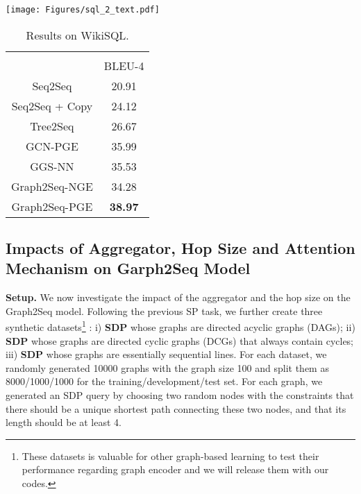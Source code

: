 \documentclass{article} \usepackage{iclr2019_conference,times}
\begin{document}
\begin{table}[t!]
\begin{minipage}[t]{0.53\linewidth}
    \vspace{0pt}
    \centering\texttt{[image: Figures/sql\_2\_text.pdf]}
    \label{fig:nlg_example}
  \end{minipage}
    \begin{minipage}[t]{0.4\linewidth}
     \vspace{0pt}
    \centering
    \small
    \begin{tabular}{cc}
    \\\\
     & BLEU-4  \\
\hline
    Seq2Seq & 20.91 \\
    Seq2Seq + Copy & 24.12 \\
    Tree2Seq & 26.67 \\
    \hline
    GCN-PGE & 35.99 \\
    GGS-NN & 35.53 \\
    Graph2Seq-NGE & 34.28 \\
    Graph2Seq-PGE & \textbf{38.97} \\
\hline
    \end{tabular}
    \caption{Results on WikiSQL.}
    \label{tab:nlg_results}
  \end{minipage}\vspace{-0.7cm}
\end{table}









\subsection{Impacts of Aggregator, Hop Size and Attention Mechanism on Garph2Seq Model}
\label{sec:impacts of aggregator and neighbor-node selection}

\textbf{Setup.} We now investigate the impact of the aggregator and the hop size on the Graph2Seq model. Following the previous SP task, we further create three synthetic datasets\footnote{These datasets is valuable for other graph-based learning to test their performance regarding graph encoder and we will release them with our codes.}
: i) \textbf{SDP} whose graphs are directed acyclic graphs (DAGs); ii) \textbf{SDP} whose graphs are directed cyclic graphs (DCGs) that always contain cycles; iii) \textbf{SDP} whose graphs are essentially sequential lines. For each dataset, we randomly generated 10000 graphs with the graph size 100 and split them as 8000/1000/1000 for the training/development/test set.
For each graph, we generated an SDP query by choosing two random nodes with the constraints that there should be a unique shortest path connecting these two nodes, and that its length should be at least 4. 
\end{document}
